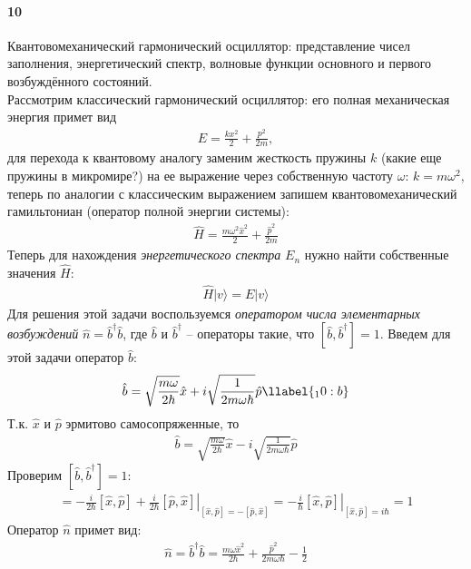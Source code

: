 


\paragraph{10}
Квантовомеханический гармонический осциллятор: представление чисел заполнения, энергетический спектр, волновые функции основного и первого возбуждённого состояний.\\

Рассмотрим классический гармонический осциллятор: его полная механическая энергия примет вид
\begin{gather*}
E = \frac{kx^2}{2}+\frac{p^2}{2m},
\end{gather*}
для перехода к квантовому аналогу заменим жесткость пружины $k$ (какие еще пружины в микромире?) на ее выражение через собственную частоту $\omega$: $k=m\omega^2$, теперь по аналогии с классическим выражением запишем квантовомеханический гамильтониан (оператор полной энергии системы):
\begin{gather*}
\hat{H} = \frac{m\omega^2\hat{x}^2}{2}+\frac{\hat{p}^2}{2m}
\end{gather*}
Теперь для нахождения \textit{энергетического спектра} $E_n$ нужно найти собственные значения $\hat{H}$:
\begin{gather*}
\hat{H}|v\rangle = E|v\rangle
\end{gather*}
Для решения этой задачи воспользуемся \textit{оператором числа элементарных возбуждений} $\hat{n}=\hat{b}^\dagger\hat{b}$, где $\hat{b}$ и $\hat{b}^\dagger$ -- операторы такие, что $[\hat{b},\hat{b}^\dagger]=1$. Введем для этой задачи оператор $\hat{b}$: 
\begin{gather}
\hat{b} = \sqrt{\frac{m\omega}{2\hbar}}\hat{x} + i\sqrt{\frac{1}{2m\omega\hbar}}\hat{p}
\llabel{_10:b}
\end{gather}
Т.к. $\hat{x}$ и $\hat{p}$ эрмитово самосопряженные, то
\begin{gather*}
\hat{b} = \sqrt{\frac{m\omega}{2\hbar}}\hat{x} - i\sqrt{\frac{1}{2m\omega\hbar}}\hat{p}
\end{gather*}
Проверим $[\hat{b},\hat{b}^\dagger]=1$:
\begin{gather*}
[\hat{b},\hat{b}^\dagger]
=
\left.
-\frac{i}{2\hbar}[\hat{x},\hat{p}]+\frac{i}{2\hbar}[\hat{p},\hat{x}]
\right|_{[\hat{x},\hat{p}]=-[\hat{p},\hat{x}]}
=
\left.
-\frac{i}{\hbar}[\hat{x},\hat{p}]
\right|_{[\hat{x},\hat{p}]=i\hbar}
=
1
\end{gather*}
Оператор $\hat{n}$ примет вид:
\begin{gather*}
\hat{n}=\hat{b}^\dagger\hat{b}=\frac{m\omega\hat{x}^2}{2\hbar}+\frac{\hat{p}^2}{2m\omega\hbar}-\frac{1}{2}
\end{gather*}
